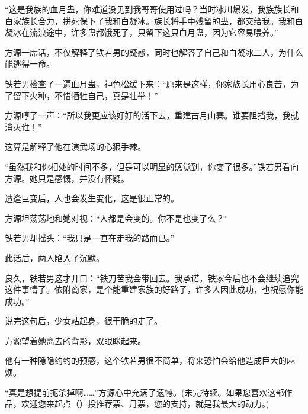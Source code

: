 \begin{this_body}
“这是我族的血月蛊，你难道没见到我哥哥使用过吗？当时冰川爆发，我族族长和白家族长合力，拼死保下了我和白凝冰。族长将手中残留的蛊，都交给我。我和白凝冰在流浪途中，许多蛊都饿死了，只留下这只血月蛊，因为它容易喂养。”

方源一席话，不仅解释了铁若男的疑惑，同时也解答了自己和白凝冰二人，为什么能逃得一命。

铁若男检查了一遍血月蛊，神色松缓下来：“原来是这样，你家族长用心良苦，为了留下火种，不惜牺牲自己，真是壮举！”

方源哼了一声：“所以我更应该好好的活下去，重建古月山寨。谁要阻挡我，我就消灭谁！”

这算是解释了他在演武场的心狠手辣。

“虽然我和你相处的时间不多，但是可以明显的感觉到，你变了很多。”铁若男看向方源。她只是感慨，并没有怀疑。

遭逢巨变后，人也会发生变化，这是很正常的。

方源坦荡荡地和她对视：“人都是会变的。你不是也变了么？”

铁若男却摇头：“我只是一直在走我的路而已。”

此话后，两人陷入了沉默。

良久，铁若男这才开口：“铁刀苦我会带回去。我承诺，铁家今后也不会继续追究这件事情了。依附商家，是个能重建家族的好路子，许多人因此成功，也祝愿你能成功。”

说完这句后，少女站起身，很干脆的走了。

方源望着她离去的背影，双眼眯起来。

他有一种隐隐约约的预感，这个铁若男很不简单，将来恐怕会给他造成巨大的麻烦。

“真是想提前扼杀掉啊……”方源心中充满了遗憾。(未完待续。如果您喜欢这部作品，欢迎您来起点（）投推荐票、月票，您的支持，就是我最大的动力。)

\end{this_body}

